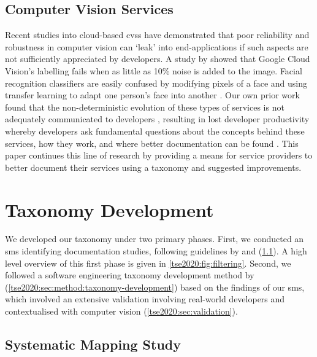 \subsection{Computer Vision Services}

Recent studies into cloud-based \glspl{cvs} have demonstrated that poor reliability and robustness in computer vision can `leak' into end-applications if such aspects are not sufficiently appreciated by developers. A study by \citet{Hosseini:2018jr} showed that Google Cloud Vision's labelling fails when as little as 10\% noise is added to the image. Facial recognition classifiers are easily confused by modifying pixels of a face and using transfer learning to adapt one person's face into another \citep{Wang:2018vl}. Our own prior work found that the non-deterministic evolution of these types of services is not adequately communicated to developers \citep{Cummaudo:2019icsme}, resulting in lost developer productivity whereby developers ask fundamental questions about the concepts behind these services, how they work, and where better documentation can be found \citep{Cummaudo:2020icse}. This paper continues this line of research by providing a means for service providers to better document their services using a taxonomy and suggested improvements.

\section{Taxonomy Development}
\label{tse2020:sec:method}


We developed our taxonomy under two primary phases. First, we conducted an \gls{sms} identifying  documentation studies, following guidelines by \citet{Kitchenham:2007dd} and \citet{Petersen:2008td} (\cref{tse2020:sec:method:lit-review}). A high level overview of this first phase is given in \cref{tse2020:fig:filtering}. Second, we followed a software engineering taxonomy development method by \citet{Usman:2017hn} (\cref{tse2020:sec:method:taxonomy-development}) based on the findings of our \gls{sms}, which involved an extensive validation involving real-world developers and contextualised with computer vision  (\cref{tse2020:sec:validation}).

\subsection{Systematic Mapping Study}
\label{tse2020:sec:method:lit-review}

